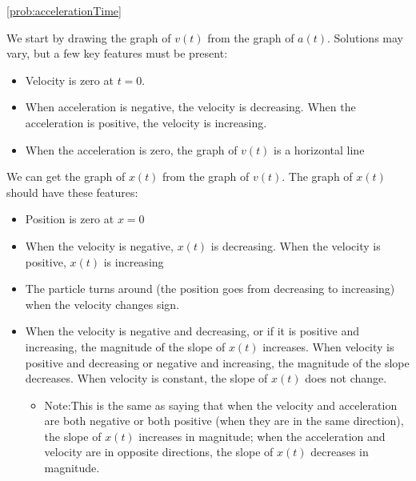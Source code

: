 \newpage
\begin{solution}{\ref{prob:accelerationTime}}{
We start by drawing the graph of $v(t)$ from the graph of $a(t)$. Solutions may vary, but a few key features must be present:
\begin{itemize}
\item Velocity is zero at $t=0$.
\item When acceleration is negative, the velocity is decreasing. When the acceleration is positive, the velocity is increasing. 
\item When the acceleration is zero, the graph of $v(t)$ is a horizontal line
\end{itemize}
We can get the graph of $x(t)$ from the graph of $v(t)$. The graph of $x(t)$ should have these features:
\begin{itemize}
\item Position is zero at $x=0$
\item When the velocity is negative, $x(t)$ is decreasing. When the velocity is positive, $x(t)$ is increasing
\item The particle turns around (the position goes from decreasing to increasing) when the velocity changes sign. 
\item When the velocity is negative and decreasing, or if it is positive and increasing, the magnitude of the slope of $x(t)$ increases. When velocity is positive and decreasing or negative and increasing, the magnitude of the slope decreases. When velocity is constant, the slope of $x(t)$ does not change. 
\begin{itemize}
\item Note:This is the same as saying that when the velocity and acceleration are both negative or both positive (when they are in the same direction), the slope of $x(t)$ increases in magnitude; when the acceleration and velocity are in opposite directions, the slope of $x(t)$ decreases in magnitude. 
\end{itemize}
\end{itemize}}

\end{solution}


